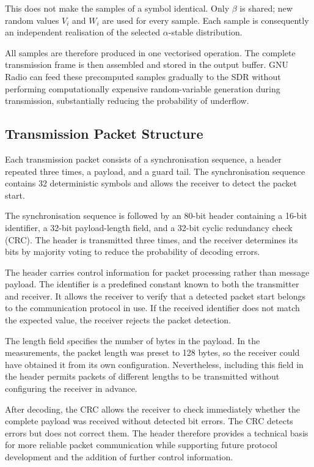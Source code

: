 \documentclass[a4paper, 12pt, openany]{book}
\begin{document}
This does not make the samples of a symbol identical. Only $\beta$ is shared; new random values $V_i$ and $W_i$ are used for every sample. Each sample is consequently an independent realisation of the selected $\alpha$-stable distribution.

All samples are therefore produced in one vectorised operation. The complete transmission frame is then assembled and stored in the output buffer. GNU Radio can feed these precomputed samples gradually to the SDR without performing computationally expensive random-variable generation during transmission, substantially reducing the probability of underflow.

\subsection{Transmission Packet Structure}

Each transmission packet consists of a synchronisation sequence, a header repeated three times, a payload, and a guard tail. The synchronisation sequence contains 32 deterministic symbols and allows the receiver to detect the packet start.

The synchronisation sequence is followed by an 80-bit header containing a 16-bit identifier, a 32-bit payload-length field, and a 32-bit cyclic redundancy check (CRC). The header is transmitted three times, and the receiver determines its bits by majority voting to reduce the probability of decoding errors.

The header carries control information for packet processing rather than message payload. The identifier is a predefined constant known to both the transmitter and receiver. It allows the receiver to verify that a detected packet start belongs to the communication protocol in use. If the received identifier does not match the expected value, the receiver rejects the packet detection.

The length field specifies the number of bytes in the payload. In the measurements, the packet length was preset to 128 bytes, so the receiver could have obtained it from its own configuration. Nevertheless, including this field in the header permits packets of different lengths to be transmitted without configuring the receiver in advance.

After decoding, the CRC allows the receiver to check immediately whether the complete payload was received without detected bit errors. The CRC detects errors but does not correct them. The header therefore provides a technical basis for more reliable packet communication while supporting future protocol development and the addition of further control information.
\end{document}
